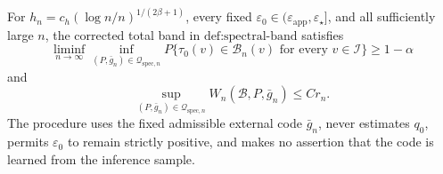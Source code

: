 For \(h_n=c_h(\log n/n)^{1/(2\beta+1)}\), every fixed \(\varepsilon_0\in(\varepsilon_{\mathrm{app}},\varepsilon_\star]\), and all sufficiently large \(n\), the corrected total band in \(\text{def:spectral-band}\) satisfies
\[
 \liminf_{n\to\infty}\inf_{(P,\bar g_n)\in\mathcal Q_{\mathrm{spec},n}}P\{\tau_0(v)\in\mathcal B_n(v)\text{ for every }v\in\mathcal I\}\ge1-\alpha
\]
and
\[
 \sup_{(P,\bar g_n)\in\mathcal Q_{\mathrm{spec},n}}W_n(\mathcal B,P,\bar g_n)\le Cr_n.
\]
The procedure uses the fixed admissible external code \(\bar g_n\), never estimates \(q_0\), permits \(\varepsilon_0\) to remain strictly positive, and makes no assertion that the code is learned from the inference sample.